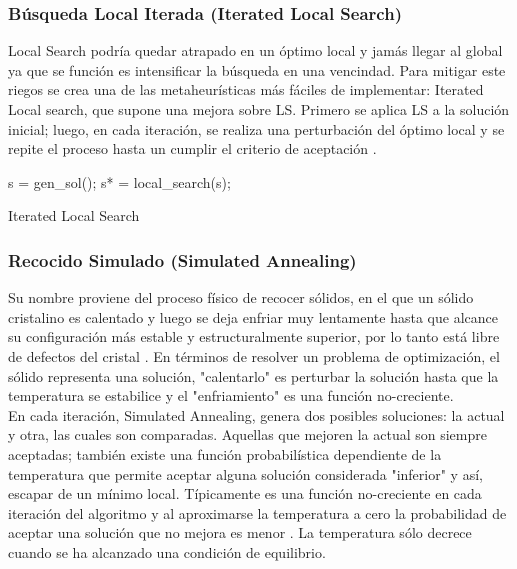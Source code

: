 \documentclass{ci5652}
\begin{document}

\subsubsection{Búsqueda Local Iterada (Iterated Local Search)}

Local Search podría quedar atrapado en un óptimo local y jamás llegar al global
ya que se función es intensificar la búsqueda en una vencindad. Para mitigar
este riegos se crea una de las metaheurísticas más fáciles de implementar:
Iterated Local search, que supone una mejora sobre LS. Primero se aplica LS a la
solución inicial; luego, en cada iteración, se realiza una perturbación del
óptimo local y se repite el proceso hasta un cumplir el criterio de aceptación
\cite{Talbi_2009}.\\

\begin{algorithm}
 \DontPrintSemicolon
 \vspace*{0.1cm}
  s = gen\_sol();\;
  s* = local\_search(s);\;
 \vspace*{0.1cm}
 \caption{Iterated Local Search}
\end{algorithm}



\subsubsection{Recocido Simulado (Simulated Annealing)}

Su nombre proviene del proceso físico de recocer sólidos, en el que un sólido 
cristalino es calentado y luego se deja enfriar muy lentamente hasta que alcance
su configuración más estable y estructuralmente superior, por lo tanto está 
libre de defectos del cristal \cite{Glover_2003}. En términos de resolver un 
problema de optimización, el sólido representa una solución, "calentarlo" es 
perturbar la solución hasta que la temperatura se estabilice y el "enfriamiento"
es una función no-creciente.\\

En cada iteración, Simulated Annealing, genera dos posibles soluciones: la
actual y otra, las cuales son comparadas. Aquellas que mejoren la actual 
son siempre aceptadas; también existe una función probabilística dependiente de
la temperatura que permite aceptar alguna solución considerada "inferior" y así,
escapar de un mínimo local. Típicamente es una función no-creciente en cada
iteración del algoritmo y al aproximarse la temperatura a cero la probabilidad
de aceptar una solución que no mejora es menor \cite{Glover_2003}. La 
temperatura sólo decrece cuando se ha alcanzado una condición de equilibrio.\\ 
\end{document}
